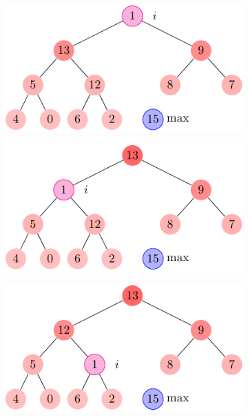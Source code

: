 \begin{description}
\begin{ex}
\begin{figure}[H]
\begin{subfigure}[t]{.40\textwidth}
        \end{subfigure}
        \begin{subfigure}[t]{.40\textwidth}
          \centering
          \includegraphics[scale=0.8]{img/6_5-1/6_5-1_3}
          \caption{}\label{fig:6_5-1_3}
        \end{subfigure}
        \begin{subfigure}[t]{.40\textwidth}
          \centering
          \includegraphics[scale=0.8]{img/6_5-1/6_5-1_4}
          \caption{}\label{fig:6_5-1_4}
        \end{subfigure}
        \begin{subfigure}[t]{.40\textwidth}
          \centering
          \includegraphics[scale=0.8]{img/6_5-1/6_5-1_5}
          \caption{}\label{fig:6_5-1_5}
        \end{subfigure}
        \begin{subfigure}[t]{.40\textwidth}

\end{subfigure}
\end{figure}
\end{ex}
\end{description}
